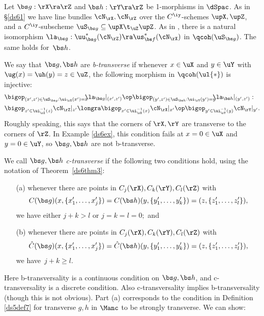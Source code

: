 \documentclass{article}
\begin{document}
\begin{dfn} Let $\bs g:\rX\ra\rZ$ and $\bs h:\rY\ra\rZ$ be
1-morphisms in $\dSpac$. As in \S\ref{ds61} we have line bundles
$\cN_\rX,\cN_\rZ$ over the $C^\iy$-schemes $\upX,\upZ$, and a
$C^\iy$-subscheme $\uS_{\bs g}\subseteq\upX\t_\uZ\upZ$. As in
\cite[\S 7.1]{Joyc6}, there is a natural isomorphism $\la_{\bs
g}:\uu_{\bs g}^*(\cN_\rZ)\ra \us_{\bs f}^*(\cN_\rX)$ in
$\qcoh(\uS_{\bs g})$. The same holds for~$\bs h$.

We say that $\bs g,\bs h$ are {\it b-transverse\/} if whenever
$x\in\uX$ and $y\in\uY$ with $\ug(x)=\uh(y)=z\in\uZ$, the following
morphism in $\qcoh(\ul{*})$ is injective:
\begin{align*}
&\bigop_{(x',z')\in\uS_{\bs g}:\ui_\rX(x')=x}\!\!\! \la_{\bs
g}\vert_{(x',z')}\op\bigop_{(y',z')\in\uS_{\bs
h}:\ui_\rY(y')=y}\!\!\! \la_{\bs h}\vert_{(y',z')}:\\
&\bigop_{z'\in\ui_\rZ^{-1}(z)}\cN_\rZ\vert_{z'}\longra
\bigop_{x'\in\ui_\rX^{-1}(x)}\cN_\rX\vert_{x'}\op
\bigop_{y'\in\ui_\rY^{-1}(y)}\cN_\rY\vert_{y'}.
\end{align*}
Roughly speaking, this says that the corners of $\rX,\rY$ are
transverse to the corners of $\rZ$. In Example \ref{ds6ex}, this
condition fails at $x=0\in\uX$ and $y=0\in\uY$, so $\bs g,\bs h$ are
not b-transverse.

We call $\bs g,\bs h$ {\it c-transverse\/} if the following two
conditions hold, using the notation of Theorem~\ref{ds6thm3}:
\begin{itemize}
\setlength{\itemsep}{0pt}
\setlength{\parsep}{0pt}
\item[(a)] whenever there are points in
$C_j(\rX),C_k(\rY),C_l(\rZ)$ with
\begin{equation*}
C(\bs g)(x,\{x_1',\ldots,x_j'\})=C(\bs h)(y,\{y_1',\ldots,
y_k'\})=(z,\{z_1',\ldots,z_l'\}),
\end{equation*}
we have either $j+k>l$ or $j=k=l=0;$ and
\item[(b)] whenever there are points in
$C_j(\rX),C_k(\rY),C_l(\rZ)$ with
\begin{equation*}
\hat C(\bs g)(x,\{x_1',\ldots,x_j'\})=\hat C(\bs
h)(y,\{y_1',\ldots, y_k'\})=(z,\{z_1',\ldots,z_l'\}),
\end{equation*}
we have~$j+k\ge l$.
\end{itemize}
\label{ds6def4}
\end{dfn}

Here b-transversality is a continuous condition on $\bs g,\bs h$,
and c-transversality is a discrete condition. Also c-transversality
implies b-transversality (though this is not obvious). Part (a)
corresponds to the condition in Definition \ref{ds5def7} for
transverse $g,h$ in $\Manc$ to be strongly transverse. We can show:
\end{document}

